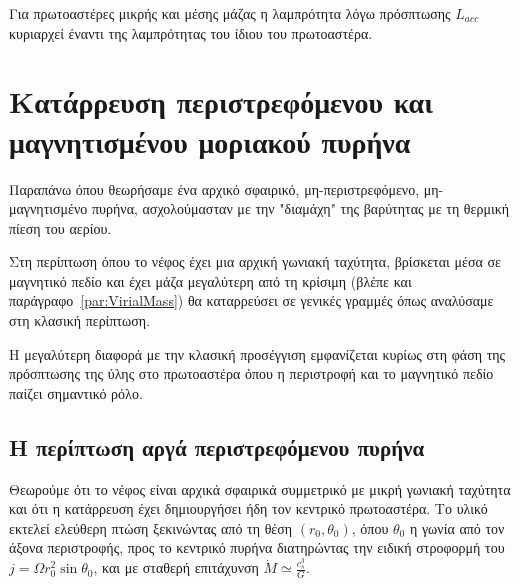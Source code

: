 \documentclass[a4paper,12pt]{memoir}
\begin{document}
Για πρωτοαστέρες μικρής και μέσης μάζας η λαμπρότητα λόγω πρόσπτωσης $L_{acc}$ κυριαρχεί έναντι της λαμπρότητας του ίδιου του πρωτοαστέρα.


\section{Κατάρρευση περιστρεφόμενου και μαγνητισμένου μοριακού πυρήνα}
Παραπάνω όπου θεωρήσαμε ένα αρχικό σφαιρικό, μη-περιστρεφόμενο, μη-μαγνητισμένο πυρήνα, ασχολούμασταν με την "διαμάχη" της βαρύτητας με τη θερμική πίεση του αερίου. 

Στη περίπτωση όπου το νέφος έχει μια αρχική γωνιακή ταχύτητα, βρίσκεται μέσα σε μαγνητικό πεδίο και έχει μάζα μεγαλύτερη από τη κρίσιμη (βλέπε και παράγραφο~\ref{par:VirialMass}) θα καταρρεύσει σε γενικές γραμμές όπως αναλύσαμε στη κλασική περίπτωση.

Η μεγαλύτερη διαφορά με την κλασική προσέγγιση εμφανίζεται κυρίως στη φάση της πρόσπτωσης της ύλης στο πρωτοαστέρα όπου η περιστροφή και το μαγνητικό πεδίο παίζει σημαντικό ρόλο.

\subsection{Η περίπτωση αργά περιστρεφόμενου πυρήνα}
Θεωρούμε ότι το νέφος είναι αρχικά σφαιρικά συμμετρικό με μικρή γωνιακή ταχύτητα και ότι η κατάρρευση έχει δημιουργήσει ήδη τον κεντρικό πρωτοαστέρα.
Το υλικό εκτελεί ελεύθερη πτώση ξεκινώντας από τη θέση $(r_0,\theta _0)$, όπου $\theta _0$ η γωνία από τον άξονα περιστροφής, προς το κεντρικό πυρήνα διατηρώντας την ειδική στροφορμή του $j=\Omega r_0 ^2 \sin \theta_0$, και με σταθερή επιτάχυνση $\dot{M} \simeq \frac{c_s ^3}{G}$.   
\end{document}

